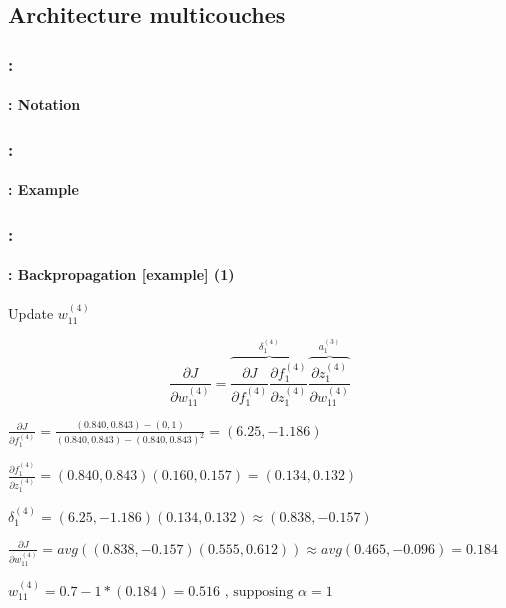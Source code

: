 \documentclass[xcolor=table]{beamer}
\begin{document}
\subsection{Architecture multicouches}

\begin{frame}
	\frametitle{\insertshortsubtitle: \insertsection}
	\framesubtitle{\insertsubsection: Notation}

	\begin{center}
	\end{center}

\end{frame}

\begin{frame}
	\frametitle{\insertshortsubtitle: \insertsection}
	\framesubtitle{\insertsubsection: Example}


\end{frame}

\begin{frame}
	\frametitle{\insertshortsubtitle: \insertsection}
	\framesubtitle{\insertsubsection: Backpropagation [example] (1)}
	
	Update $w_{11}^{(4)}$
	
	\small
	
	\[
	\frac{\partial J}{\partial w_{11}^{(4)}} = \overbrace{\frac{\partial J}{\partial f_{1}^{(4)}} \frac{\partial f_{1}^{(4)}}{\partial z_{1}^{(4)}}}^{\delta_{1}^{(4)}} \overbrace{\frac{\partial z_{1}^{(4)}}{\partial w_{11}^{(4)}}}^{a_{1}^{(3)}}
	\]
	
	$ 
	\frac{\partial J}{\partial f_{1}^{(4)}} = \frac{(0.840, 0.843) - (0, 1)}{(0.840, 0.843) - (0.840, 0.843)^2} 
	= (6.25, -1.186)
	$
	
	$ 
	\frac{\partial f_{1}^{(4)}}{\partial z_{1}^{(4)}} = (0.840, 0.843) (0.160, 0.157) = (0.134, 0.132)
	$
	
	$
	\delta_{1}^{(4)} = (6.25, -1.186) (0.134, 0.132) \approx (0.838, -0.157)
	$
	
	$
	\frac{\partial J}{\partial w_{11}^{(4)}} = avg((0.838, -0.157) (0.555, 0.612)) 
	\approx avg(0.465, -0.096) = 0.184
	$
	
	$
	w_{11}^{(4)} = 0.7 - 1 * (0.184) = 0.516 \text{ , supposing } \alpha = 1
	$

\end{frame}
\end{document}
